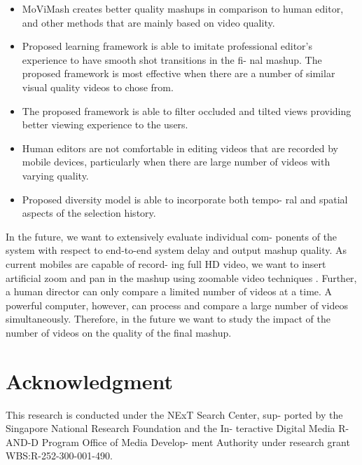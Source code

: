 \documentclass{sig-alternate}
\begin{document}
\begin{itemize}
\item MoViMash creates better quality mashups in comparison to
human editor, and other methods that are mainly based on
video quality.
\item Proposed learning framework is able to imitate professional
editor’s experience to have smooth shot transitions in the fi-
nal mashup. The proposed framework is most effective when
there are a number of similar visual quality videos to chose
from.
\item The proposed framework is able to filter occluded and tilted
views providing better viewing experience to the users.
\item Human editors are not comfortable in editing videos that are
recorded by mobile devices, particularly when there are large
number of videos with varying quality.
\item Proposed diversity model is able to incorporate both tempo-
ral and spatial aspects of the selection history.
\end{itemize}
In the future, we want to extensively evaluate individual com-
ponents of the system with respect to end-to-end system delay and
output mashup quality. As current mobiles are capable of record-
ing full HD video, we want to insert artificial zoom and pan in the
mashup using zoomable video techniques \cite{salas:eleven}. Further, a human
director can only compare a limited number of videos at a time.
A powerful computer, however, can process and compare a large
number of videos simultaneously. Therefore, in the future we want
to study the impact of the number of videos on the quality of the
final mashup.

\section*{Acknowledgment}
This research is conducted under the NExT Search Center, sup-
ported by the Singapore National Research Foundation and the In-
teractive Digital Media R-AND-D Program Office of Media Develop-
ment Authority under research grant WBS:R-252-300-001-490.




%

\end{document}
